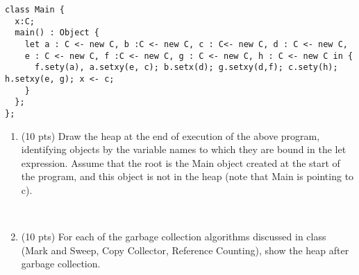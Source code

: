\documentclass[10pt]{article}
\begin{document}
\begin{enumerate}
\begin{verbatim}
class Main {
  x:C;
  main() : Object {
    let a : C <- new C, b :C <- new C, c : C<- new C, d : C <- new C,
    e : C <- new C, f :C <- new C, g : C <- new C, h : C <- new C in {
      f.sety(a), a.setxy(e, c); b.setx(d); g.setxy(d,f); c.sety(h); h.setxy(e, g); x <- c;
    }
  };
};
\end{verbatim}
        \begin{enumerate}
          \item (10 pts) Draw the heap at the end of execution of the above program, identifying objects by the variable
                names to which they are bound in the let expression. Assume that the root is the Main object created at the start
                of the program, and this object is not in the heap (note that Main is pointing to c).
                \textcolor{blue}{\\
                  \begin{center}\end{center}
                }
          \item (10 pts) For each of the garbage collection algorithms discussed in class (Mark and Sweep, Copy Collector,
                Reference Counting), show the heap after garbage collection.

\end{enumerate}
\end{enumerate}
\end{document}
